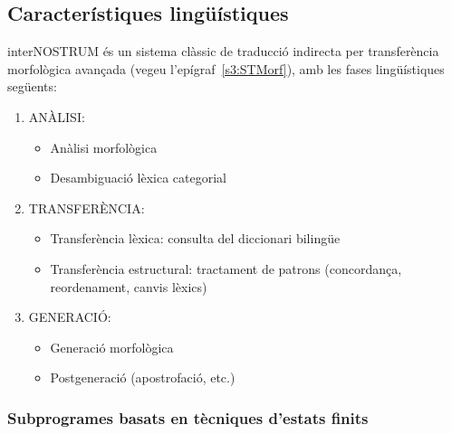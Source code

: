 \subsection{Característiques lingüístiques}

{\sf interNOSTRUM} és un sistema clàssic de traducció indirecta per
transferència morfològica avançada (vegeu l'epígraf~\ref{s3:STMorf}),
amb les fases lingüístiques següents:
\begin{enumerate}
\item ANÀLISI: \begin{itemize}
      \item Anàlisi morfològica
      \item Desambiguació lèxica categorial
      \end{itemize}
\item TRANSFERÈNCIA:\begin{itemize}
      \item Transferència lèxica: consulta del diccionari bilingüe
      \item Transferència estructural: tractament de patrons
        (concordança, reordenament, canvis lèxics)\end{itemize}
\item GENERACIÓ:\begin{itemize}
                \item Generació morfològica
                \item Postgeneració (apostrofació, etc.)
                \end{itemize}
\end{enumerate}

\subsubsection{Subprogrames basats en tècniques d'estats finits} 

